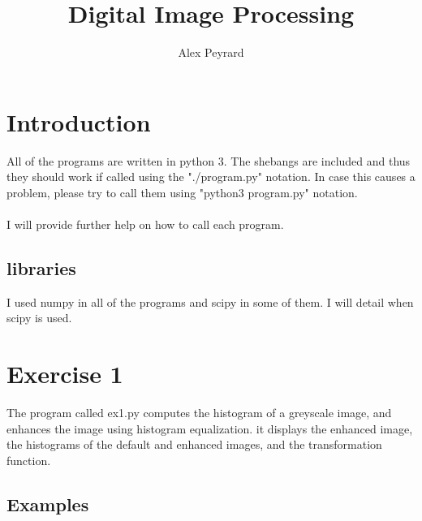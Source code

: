 \documentclass[10pt]{article}
\author{Alex Peyrard}
\title{Digital Image Processing}
\begin{document}
\maketitle
\section{Introduction}
All of the programs are written in python 3. The shebangs are included and thus they should work if called using the "./program.py" notation. In case this causes a problem, please try to call them using "python3 program.py" notation.\\\\
I will provide further help on how to call each program.
\subsection{libraries}
I used numpy in all of the programs and scipy in some of them. I will detail when scipy is used.
\section{Exercise 1}
The program called ex1.py computes the histogram of a greyscale image, and enhances the image using histogram equalization. it displays the enhanced image, the histograms of the default and enhanced images, and the transformation function.
\subsection{Examples}
\end{document}
